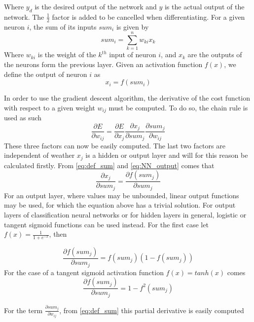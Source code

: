 Where $y_d$ is the desired output of the network and $y$ is the actual output of the network. The $\frac{1}{2}$ factor is added to be cancelled when differentiating. For a given neuron $i$, the sum of its inputs $sum_i$ is given by
\begin{equation}\label{eq:def_sum}
sum_i = \sum ^n_{k=1} w_{ki} x_k
\end{equation}
Where $w_{ki}$ is the weight of the $k^{th}$ input of neuron $i$, and $x_k$ are the outputs of the neurons form the previous layer. Given an activation function $f(x)$, we define the output of neuron $i$ as 
\begin{equation}\label{eq:NN_output}
x_i = f(sum_i)
\end{equation}

In order to use the gradient descent algorithm, the derivative of the cost function with respect to a given weight $w_{ij}$ must be computed. To do so, the chain rule is used as such
\begin{equation}\label{eq:gradient}
\frac{\partial E}{\partial w_{ij}} = \frac{\partial E}{\partial x_j}\frac{\partial x_j}{\partial sum_j}\frac{\partial sum_j}{\partial w_{ij}}
\end{equation}
These three factors can now be easily computed. The last two factors are independent of weather $x_j$ is a hidden or output layer and will for this reason be calculated firstly. From \ref{eq:def_sum} and \ref{eq:NN_output} comes that
\begin{equation}
\frac{\partial x_j}{\partial sum_j} = \frac{\partial f(sum_j)}{\partial sum_j}
\end{equation}
For an output layer, where values may be unbounded, linear output functions may be used, for which the equation above has a trivial solution. For output layers of classification neural networks or for hidden layers in general, logistic or tangent sigmoid functions can be used instead. For the first case let $f(x)=\frac{1}{1+e^{-x}}$, then

\begin{equation}
\frac{\partial f(sum_j)}{\partial sum_j}=f(sum_j)(1-f(sum_j))
\end{equation}
For the case of a tangent sigmoid activation function $f(x)=tanh(x)$ comes
\begin{equation}
\frac{\partial f(sum_j)}{\partial sum_j}=1-f^2(sum_j)
\end{equation}

For the term $\frac{\partial sum_j}{\partial w_{ij}}$, from \ref{eq:def_sum} this partial derivative is easily computed

